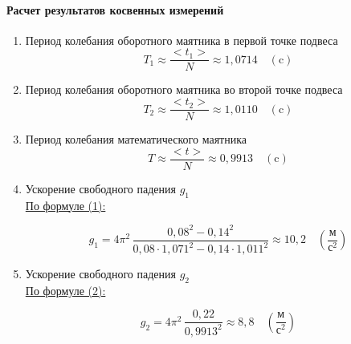 \documentclass{article}
\begin{document}
\paragraph{Расчет результатов косвенных измерений }
\begin{enumerate}
\item Период колебания оборотного маятника в первой точке подвеса
$$T_1\approx\frac{<t_1>}{N}\approx 1{,}0714\quad(\mbox{c}) $$
\item Период колебания оборотного маятника во второй точке подвеса
$$T_2\approx\frac{<t_2>}{N}\approx 1{,}0110\quad(\mbox{c})  $$
\item Период колебания математического маятника
$$T\approx\frac{<t>}{N}\approx 0{,}9913\quad(\mbox{c})  $$
\item Ускорение свободного падения $g_1$\\
\hyperlink{formula}{По формуле (1):}

$$ g_1 = 4\pi^2\,\frac{0,08^2-0,14^2}{0,08\cdot1,071^2-0,14\cdot1,011^2}\approx10,2 \quad\left(\frac{\mbox{м}}{\mbox{с}^2}\right)$$
\begin{center}
\end{center}

\item Ускорение свободного падения $g_2$\\
\hyperlink{formula}{По формуле (2):}

$$ g_2=4\pi^2\,\frac{0,22}{0,9913^2}\approx8,8\quad\left(\frac{\mbox{м}}{\mbox{с}^2}\right)$$
\begin{center}
\end{center}



\end{enumerate}
\end{document}
